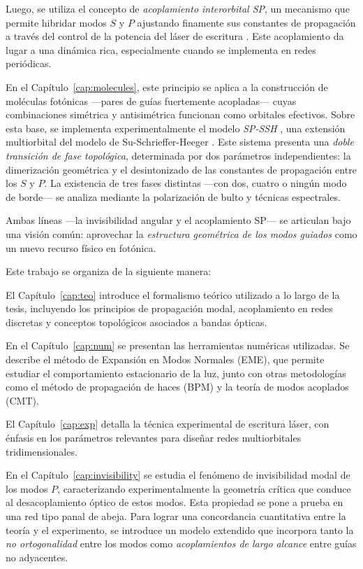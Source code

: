 Luego, se utiliza el concepto de \textit{acoplamiento interorbital SP}, un mecanismo que permite hibridar modos \( S \) y \( P \) ajustando finamente sus constantes de propagación a través del control de la potencia del láser de escritura \cite{interorbital}. Este acoplamiento da lugar a una dinámica rica, especialmente cuando se implementa en redes periódicas.

En el Capítulo~\ref{cap:molecules}, este principio se aplica a la construcción de moléculas fotónicas —pares de guías fuertemente acopladas— cuyas combinaciones simétrica y antisimétrica funcionan como orbitales efectivos. Sobre esta base, se implementa experimentalmente el modelo \textit{SP-SSH} \cite{SPSSH}, una extensión multiorbital del modelo de Su-Schrieffer-Heeger \citep{ssh}. Este sistema presenta una \textit{doble transición de fase topológica}, determinada por dos parámetros independientes: la dimerización geométrica y el desintonizado de las constantes de propagación entre los $S$ y $P$. La existencia de tres fases distintas —con dos, cuatro o ningún modo de borde— se analiza mediante la polarización de bulto y técnicas espectrales.

Ambas líneas —la invisibilidad angular y el acoplamiento SP— se articulan bajo una visión común: aprovechar la \textit{estructura geométrica de los modos guiados} como un nuevo recurso físico en fotónica.

\vspace{1em}

Este trabajo se organiza de la siguiente manera:

El Capítulo~\ref{cap:teo} introduce el formalismo teórico utilizado a lo largo de la tesis, incluyendo los principios de propagación modal, acoplamiento en redes discretas y conceptos topológicos asociados a bandas ópticas.

En el Capítulo~\ref{cap:num} se presentan las herramientas numéricas utilizadas. Se describe el método de Expansión en Modos Normales (EME), que permite estudiar el comportamiento estacionario de la luz, junto con otras metodologías como el método de propagación de haces (BPM) y la teoría de modos acoplados (CMT).

El Capítulo~\ref{cap:exp} detalla la técnica experimental de escritura láser, con énfasis en los parámetros relevantes para diseñar redes multiorbitales tridimensionales.

En el Capítulo~\ref{cap:invisibility} se estudia el fenómeno de invisibilidad modal de los modos \( P \), caracterizando experimentalmente la geometría crítica que conduce al desacoplamiento óptico de estos modos. Esta propiedad se pone a prueba en una red tipo panal de abeja. Para lograr una concordancia cuantitativa entre la teoría y el experimento, se introduce un modelo extendido que incorpora tanto la \textit{no ortogonalidad} entre los modos como \textit{acoplamientos de largo alcance} entre guías no adyacentes.

